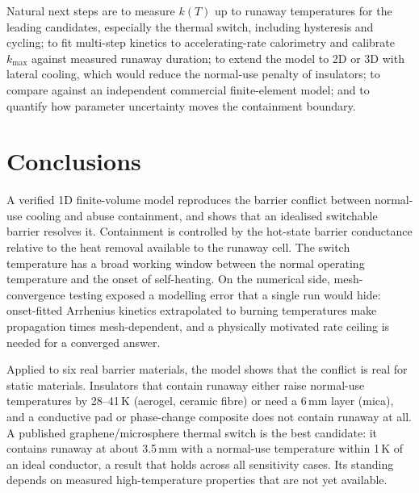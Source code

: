 \documentclass[11pt]{article}
\newcommand{\kmax}{k_\mathrm{max}}
\begin{document}
Natural next steps are to measure $k(T)$ up to runaway temperatures for the leading
candidates, especially the thermal switch, including hysteresis and cycling; to fit
multi-step kinetics to accelerating-rate calorimetry and calibrate $\kmax$ against measured
runaway duration; to extend the model to 2D or 3D with lateral cooling, which would reduce
the normal-use penalty of insulators; to compare against an independent commercial
finite-element model; and to quantify how parameter uncertainty moves the containment
boundary.

\section{Conclusions}

A verified 1D finite-volume model reproduces the barrier conflict between normal-use
cooling and abuse containment, and shows that an idealised switchable barrier resolves
it. Containment is controlled by the hot-state barrier conductance relative to the heat
removal available to the runaway cell. The switch temperature has a broad working window
between the normal operating temperature and the onset of self-heating. On the numerical
side, mesh-convergence testing exposed a modelling error that a single run would hide:
onset-fitted Arrhenius kinetics extrapolated to burning temperatures make propagation
times mesh-dependent, and a physically motivated rate ceiling is needed for a converged
answer.

Applied to six real barrier materials, the model shows that the conflict is real for
static materials. Insulators that contain runaway either raise normal-use temperatures
by 28--41\,K (aerogel, ceramic fibre) or need a 6\,mm layer (mica), and a conductive pad
or phase-change composite does not contain runaway at all. A published graphene/microsphere
thermal switch is the best candidate: it contains runaway at about 3.5\,mm with a
normal-use temperature within 1\,K of an ideal conductor, a result that holds across all
sensitivity cases. Its standing depends on measured high-temperature properties that are
not yet available.
\end{document}
